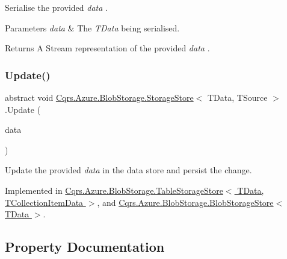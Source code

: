 Serialise the provided {\itshape data} . 


\begin{DoxyParams}{Parameters}
{\em data} & The {\itshape T\+Data}  being serialised.\\
\hline
\end{DoxyParams}
\begin{DoxyReturn}{Returns}
A Stream representation of the provided {\itshape data} .
\end{DoxyReturn}
\mbox{\label{classCqrs_1_1Azure_1_1BlobStorage_1_1StorageStore_ae9ca8bfe30040f77e349a4d47b31da70_ae9ca8bfe30040f77e349a4d47b31da70}} 
\subsubsection{\texorpdfstring{Update()}{Update()}}
{\footnotesize\ttfamily abstract void \hyperlink{classCqrs_1_1Azure_1_1BlobStorage_1_1StorageStore}{Cqrs.\+Azure.\+Blob\+Storage.\+Storage\+Store}$<$ T\+Data, T\+Source $>$.Update (\begin{DoxyParamCaption}\item[{T\+Data}]{data }\end{DoxyParamCaption})\hspace{0.3cm}{\ttfamily [pure virtual]}}



Update the provided {\itshape data}  in the data store and persist the change. 



Implemented in \hyperlink{classCqrs_1_1Azure_1_1BlobStorage_1_1TableStorageStore_a869eba77358b10fc298f8e13fb21d628_a869eba77358b10fc298f8e13fb21d628}{Cqrs.\+Azure.\+Blob\+Storage.\+Table\+Storage\+Store$<$ T\+Data, T\+Collection\+Item\+Data $>$}, and \hyperlink{classCqrs_1_1Azure_1_1BlobStorage_1_1BlobStorageStore_a03be976aded454866b4589de99a9e1c8_a03be976aded454866b4589de99a9e1c8}{Cqrs.\+Azure.\+Blob\+Storage.\+Blob\+Storage\+Store$<$ T\+Data $>$}.



\subsection{Property Documentation}
\mbox{\label{classCqrs_1_1Azure_1_1BlobStorage_1_1StorageStore_ad16f8d276c7570c95979b39098d1216b_ad16f8d276c7570c95979b39098d1216b}} 
